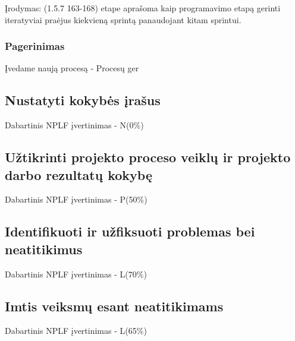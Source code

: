 \documentclass{VUMIFPSkursinis}
\begin{document}
			Įrodymas: (1.5.7 163-168) etape aprašoma kaip programavimo etapą gerinti iteratyviai praėjus kiekvieną sprintą panaudojant kitam sprintui.

			\subsubsection{Pagerinimas}
				Įvedame naują procesą - Procesų ger
		\subsection{Nustatyti kokybės įrašus}
			Dabartinis NPLF įvertinimas - N(0\%)
		\subsection{Užtikrinti projekto proceso veiklų ir projekto darbo rezultatų kokybę}
			Dabartinis NPLF įvertinimas - P(50\%)
		\subsection{Identifikuoti ir užfiksuoti problemas bei neatitikimus}
			Dabartinis NPLF įvertinimas - L(70\%)
		\subsection{Imtis veiksmų esant neatitikimams}
			Dabartinis NPLF įvertinimas - L(65\%)
\end{document}
